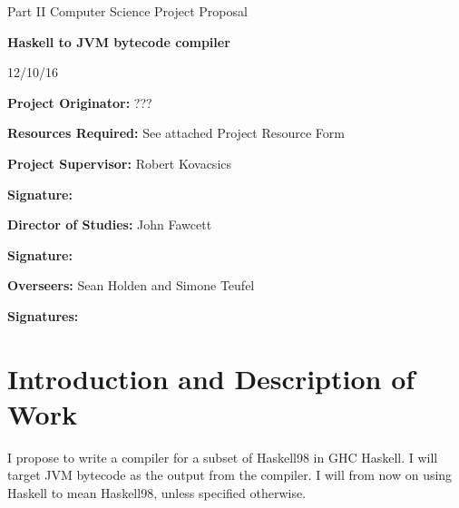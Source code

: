 \documentclass[a4paper]{article}
\begin{document}
\thispagestyle{empty}

\medskip
{}
\medskip
{}

\vfil

\centerline{\large Part II Computer Science Project Proposal}
\vspace{0.4in}
\centerline{\Large\bf Haskell to JVM bytecode compiler}
\vspace{0.3in}
\centerline{\large 12/10/16}

\vfil

{\bf Project Originator:} ??? 

\vspace{0.1in}

{\bf Resources Required:} See attached Project Resource Form

\vspace{0.5in}

{\bf Project Supervisor:} Robert Kovacsics

\vspace{0.2in}

{\bf Signature:}

\vspace{0.5in}

{\bf Director of Studies:}  John Fawcett

\vspace{0.2in}

{\bf Signature:}

\vspace{0.5in}

{\bf Overseers:} Sean Holden and Simone Teufel 

\vspace{0.2in}

{\bf Signatures:} 

\vfil
\eject



\section*{Introduction and Description of Work}

  I propose to write a compiler for a subset of Haskell98 in GHC Haskell. I will target JVM bytecode as the output from
  the compiler. I will from now on using Haskell to mean Haskell98, unless specified otherwise.
\end{document}
